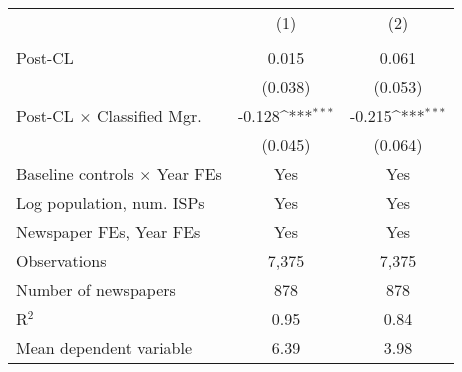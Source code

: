 {
\def\sym#1{\ifmmode^{#1}\else\(^{#1}\)\fi}
\begin{tabular}{l*{2}{c}}
\toprule
                    &&\\
                    &&\\
\midrule
Post-CL             &       0.015         &       0.061         \\
                    &     (0.038)         &     (0.053)         \\
\addlinespace
Post-CL $\times$ Classified Mgr.&      -0.128\sym{***}&      -0.215\sym{***}\\
                    &     (0.045)         &     (0.064)         \\
\addlinespace
Baseline controls $\times$ Year FEs &         Yes         &         Yes         \\
\addlinespace
Log population, num. ISPs &         Yes         &         Yes         \\
\addlinespace
Newspaper FEs, Year FEs &         Yes         &         Yes         \\
\midrule
Observations        &       7,375         &       7,375         \\
Number of newspapers&         878         &         878         \\
R$^2$               &        0.95         &        0.84         \\
Mean dependent variable&        6.39         &        3.98         \\
\bottomrule
\end{tabular}
}
